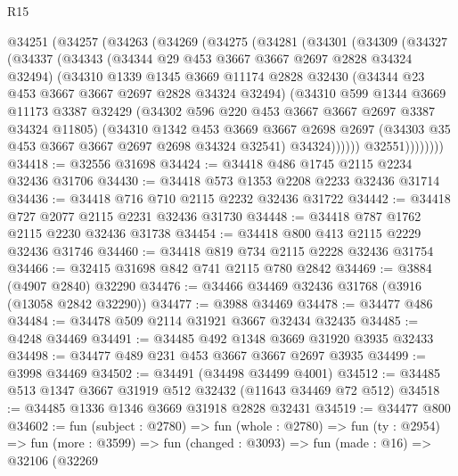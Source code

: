 \begin{lexlean}{R15}
\begin{coremodule}
    @34251
      (@34257
        (@34263
          (@34269
            (@34275
              (@34281
                (@34301
                  (@34309
                    (@34327
                      (@34337
                        (@34343
                          (@34344 @29 @453 @3667 @3667 @2697 @2828 @34324 @32494)
                          (@34310
                            @1339
                            @1345
                            @3669
                            @11174
                            @2828
                            @32430
                            (@34344 @23 @453 @3667 @3667 @2697 @2828 @34324 @32494)
                            (@34310
                              @599
                              @1344
                              @3669
                              @11173
                              @3387
                              @32429
                              (@34302 @596 @220 @453 @3667 @3667 @2697 @3387 @34324 @11805)
                              (@34310
                                @1342
                                @453
                                @3669
                                @3667
                                @2698
                                @2697
                                (@34303 @35 @453 @3667 @3667 @2697 @2698 @34324 @32541)
                                @34324))))))
                    @32551))))))))
@34418 := @32556 @31698
@34424 := @34418 @486 @1745 @2115 @2234 @32436 @31706
@34430 := @34418 @573 @1353 @2208 @2233 @32436 @31714
@34436 := @34418 @716 @710 @2115 @2232 @32436 @31722
@34442 := @34418 @727 @2077 @2115 @2231 @32436 @31730
@34448 := @34418 @787 @1762 @2115 @2230 @32436 @31738
@34454 := @34418 @800 @413 @2115 @2229 @32436 @31746
@34460 := @34418 @819 @734 @2115 @2228 @32436 @31754
@34466 := @32415 @31698 @842 @741 @2115 @780 @2842
@34469 := @3884 (@4907 @2840) @32290
@34476 := @34466 @34469 @32436 @31768 (@3916 (@13058 @2842 @32290))
@34477 := @3988 @34469
@34478 := @34477 @486
@34484 := @34478 @509 @2114 @31921 @3667 @32434 @32435
@34485 := @4248 @34469
@34491 := @34485 @492 @1348 @3669 @31920 @3935 @32433
@34498 := @34477 @489 @231 @453 @3667 @3667 @2697 @3935
@34499 := @3998 @34469
@34502 := @34491 (@34498 @34499 @4001)
@34512 := @34485 @513 @1347 @3667 @31919 @512 @32432 (@11643 @34469 @72 @512)
@34518 := @34485 @1336 @1346 @3669 @31918 @2828 @32431
@34519 := @34477 @800
@34602 := fun (subject : @2780) =>
  fun (whole : @2780) =>
  fun (ty : @2954) =>
  fun (more : @3599) =>
  fun (changed : @3093) =>
  fun (made : @16) =>
  @32106
    (@32269

\end{coremodule}
\end{lexlean}
